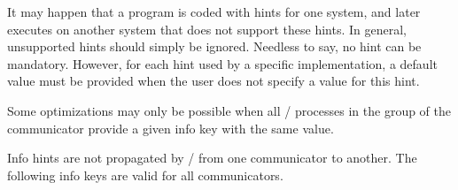 \begin{implementors}
It may happen that a program is coded with hints for one system, and
later executes on another system that does not support these hints. In
general, unsupported hints should simply be ignored. Needless to say,
no hint can be mandatory. However, for each hint used by a specific
implementation, a default value must be provided when the user does
not specify a value for this hint.
\end{implementors}

\begin{users}
Some optimizations may only be possible when all \MPI/ processes in the group of the
communicator provide a given info key with the same value.
\end{users}

Info hints are not propagated by \MPI/ from one communicator to another.
The following info keys are valid for all communicators.

